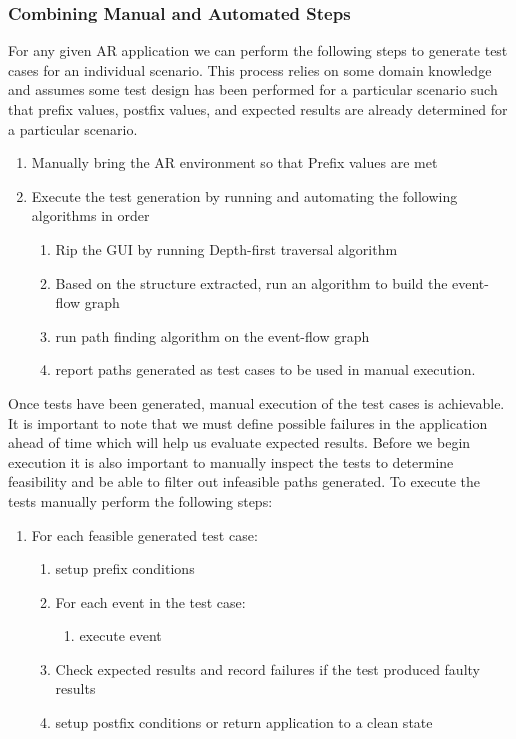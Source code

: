 \documentclass[final,3p]{CSP}
\begin{document}
\subsubsection{Combining Manual and Automated Steps}
\noindent

For any given AR application we can perform the following steps to generate test cases for an individual scenario.  This process relies on some domain knowledge and assumes some test design has been performed for a particular scenario such that prefix values, postfix values, and expected results are already determined for a particular scenario.

\begin{enumerate}
    \item Manually bring the AR environment so that Prefix values are met
    \item Execute the test generation by running and automating the following algorithms in order
    \begin{enumerate}
        \item Rip the GUI by running Depth-first traversal algorithm
        \item Based on the structure extracted, run an algorithm to build the event-flow graph
        \item run path finding algorithm on the event-flow graph
        \item report paths generated as test cases to be used in manual execution.
    \end{enumerate}

\end{enumerate}

Once tests have been generated, manual execution of the test cases is achievable.  It is important to note that we must define possible failures in the application ahead of time which will help us evaluate expected results.  Before we begin execution it is also important to manually inspect the tests to determine feasibility and be able to filter out infeasible paths generated.  To execute the tests manually perform the following steps:

\begin{enumerate}
    \item For each feasible generated test case:
    \begin{enumerate}
        \item setup prefix conditions
        \item For each event in the test case:
        \begin{enumerate}
            \item execute event
        \end{enumerate}
        \item Check expected results and record failures if the test produced faulty results
        \item setup postfix conditions or return application to a clean state
    \end{enumerate}
\end{enumerate}
\end{document}
